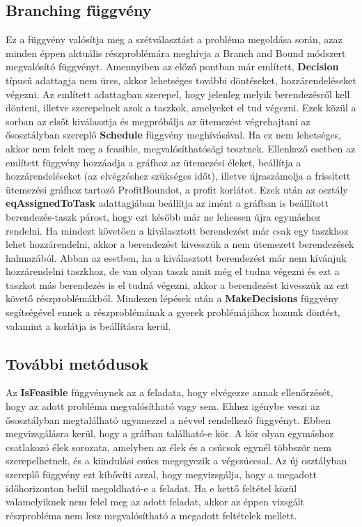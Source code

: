 \subsection{Branching függvény}
Ez a függvény valósítja meg a szétválasztást a probléma megoldása során, azaz minden éppen aktuális részproblémára meghívja a Branch and Bound módszert megvalósító függvényt.
Amennyiben az előző pontban már említett, \textbf{Decision} típusú adattagja nem üres, akkor lehetséges további döntéseket, hozzárendeléseket végezni.
Az említett adattagban szerepel, hogy jelenleg melyik berendezésről kell dönteni, illetve szerepelnek azok a taszkok, amelyeket el tud végezni.
Ezek közül a sorban az elsőt kiválasztja és megpróbálja az ütemezést végrehajtani az ősosztályban szereplő \textbf{Schedule} függvény meghívásával.
Ha ez nem lehetséges, akkor nem felelt meg a feasible, megvalósíthatósági tesztnek.
Ellenkező esetben az említett függvény hozzáadja a gráfhoz az ütemezési éleket, beállítja a hozzárendeléseket (az elvégzéshez szükséges időt), illetve újraszámolja a frissített ütemezési gráfhoz tartozó ProfitBoundot, a profit korlátot.
Ezek után az osztály \textbf{eqAssignedToTask} adattagjában beállítja az imént a gráfban is beállított berendezés-taszk párost, hogy ezt később már ne lehessen újra egymáshoz rendelni.
Ha mindezt követően a kiválasztott berendezést már csak egy taszkhoz lehet hozzárendelni, akkor a berendezést kivesszük a nem ütemezett berendezések halmazából.
Abban az esetben, ha a kiválasztott berendezést már nem kívánjuk hozzárendelni taszkhoz, de van olyan taszk amit még el tudna végezni és ezt a taszkot más berendezés is el tudná végezni, akkor a berendezést kivesszük az ezt követő részproblémákból.
Mindezen lépések után a \textbf{MakeDecisions} függvény segítségével ennek a részproblémának a gyerek problémájához hozunk döntést, valamint a korlátja is beállításra kerül.

\subsection{További metódusok}
Az \textbf{IsFeasible} függvénynek az a feladata, hogy elvégezze annak ellenőrzését, hogy az adott probléma megvalósítható vagy sem.
Ehhez igénybe veszi az ősosztályban megtalálható ugyanezzel a névvel rendelkező függvényt.
Ebben  megvizsgálásra kerül, hogy a gráfban található-e kör.
A kör olyan egymáshoz csatlakozó élek sorozata, amelyben az élek és a csúcsok egynél többször nem szerepelhetnek, és a kiindulási csúcs megegyezik a végcsúccsal.
Az új osztályban szereplő függvény ezt kibővíti azzal, hogy megvizsgálja, hogy a megadott időhorizonton belül megoldható-e a feladat.
Ha e kettő feltétel közül valamelyiknek nem felel meg az adott feladat, akkor az éppen vizsgált részprobléma nem lesz megvalósítható a megadott feltételek mellett.


